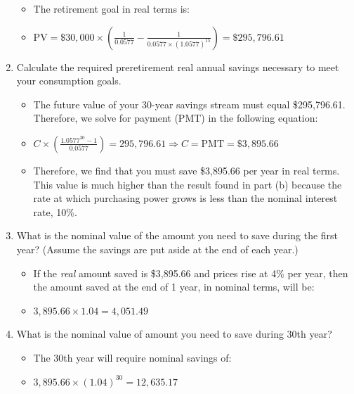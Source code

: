 \documentclass[10pt,landscape]{article}
\begin{document}
\begin{multicols*}{3}
\begin{enumerate}[label=(\alph*),topsep=0pt,noitemsep,wide=0pt, leftmargin=\dimexpr\labelwidth + 2\labelsep\relax]
\begin{itemize}[topsep=0pt,noitemsep,wide=0pt, leftmargin=\dimexpr{} + 2\relax]
        \item The retirement goal in real terms is:
        \item $\text{PV} = \$30,000 \times \left( \frac{1}{0.0577} - \frac{1}{0.0577 \times (1.0577)^{15}} \right) = \$295,796.61$
    \end{itemize}
    \item Calculate the required preretirement real annual savings necessary to meet your consumption goals.
    \begin{itemize}[topsep=0pt,noitemsep,wide=0pt, leftmargin=\dimexpr{} + 2\relax]
        \item The future value of your 30-year savings stream must equal \$295,796.61. Therefore, we solve for payment (PMT) in the following equation:
        \item $C \times \left( \frac{1.0577^{30} - 1}{0.0577} \right) = 295,796.61 \Rightarrow C = \text{PMT} = \$3,895.66$
        \item Therefore, we find that you must save \$3,895.66 per year in real terms. This value is much higher than the result found in part (b) because the rate at which purchasing power grows is less than the nominal interest rate, 10\%.
    \end{itemize}
    \item What is the nominal value of the amount you need to save during the first year? (Assume the savings are put aside at the end of each year.)
    \begin{itemize}[topsep=0pt,noitemsep,wide=0pt, leftmargin=\dimexpr{} + 2\relax]
        \item If the \textit{real} amount saved is \$3,895.66 and prices rise at 4\% per year, then the amount saved at the end of 1 year, in nominal terms, will be:
        \item $3,895.66 \times 1.04 = 4,051.49$
    \end{itemize}
    \item What is the nominal value of amount you need to save during 30th year?
    \begin{itemize}[topsep=0pt,noitemsep,wide=0pt, leftmargin=\dimexpr{} + 2\relax]
        \item The 30th year will require nominal savings of:
        \item $3,895.66 \times (1.04)^{30} = 12,635.17$
    \end{itemize}
\end{enumerate}


\end{multicols*}
\end{document}
